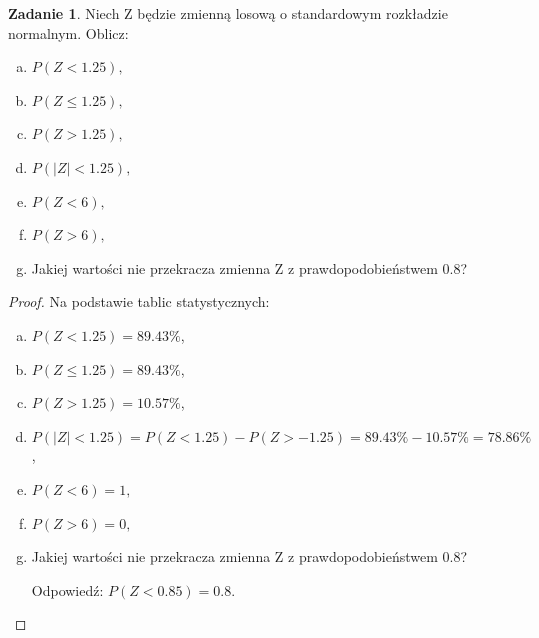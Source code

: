 \documentclass[11pt]{article}
\theoremstyle{definition}
\newtheorem{zadanie}{Zadanie}
\numberwithin{zadanie}{section}
\begin{document}
\begin{zadanie}
    Niech Z będzie zmienną losową o standardowym rozkładzie normalnym. Oblicz:

    \begin{enumerate}[a)]
        \item $P (Z < 1.25),$
        \item $P (Z \leq 1.25),$
        \item $P (Z > 1.25),$
        \item $P (|Z| < 1.25),$
        \item $P (Z < 6),$
        \item $P (Z > 6),$
        \item Jakiej wartości nie przekracza zmienna Z z prawdopodobieństwem 0.8?
    \end{enumerate}
\end{zadanie}
\begin{proof}
    Na podstawie tablic statystycznych:

    \begin{enumerate}[a)]
        \item $P (Z < 1.25) = 89.43\%$,
        \item $P (Z \leq 1.25) = 89.43\%$,
        \item $P (Z > 1.25) = 10.57\%$,
        \item $P (|Z| < 1.25) = P(Z<1.25) - P(Z>-1.25) = 89.43\% - 10.57\% = 78.86\%$,
        \item $P (Z < 6) = 1,$
        \item $P (Z > 6) = 0,$
        \item Jakiej wartości nie przekracza zmienna Z z prawdopodobieństwem 0.8?

              Odpowiedź: $P(Z<0.85) = 0.8$.
    \end{enumerate}
\end{proof}
\end{document}
